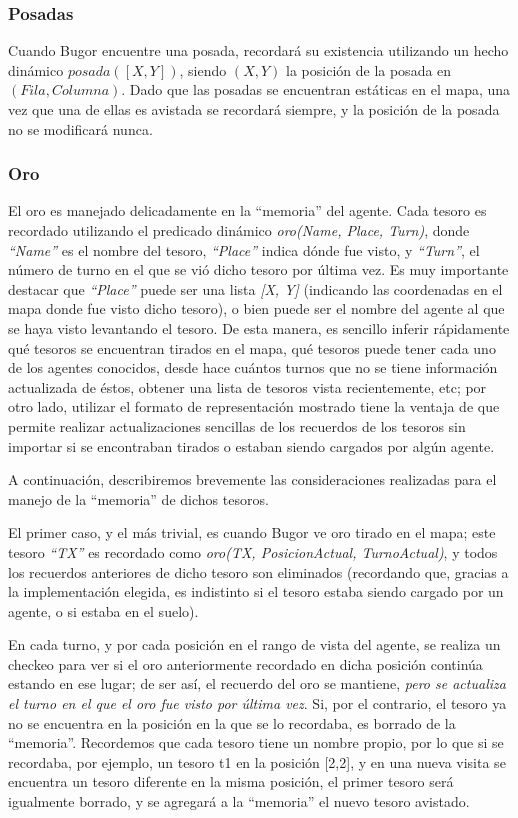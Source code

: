 \documentclass[a4paper,10pt,spanish]{article}
\begin{document}
		\subsubsection{Posadas}
		
		Cuando Bugor encuentre una posada, recordar\'a su existencia utilizando un hecho din\'amico $posada([X, Y])$, siendo $(X, Y)$ la posici\'on de la posada en $(Fila,Columna)$. Dado que las posadas se encuentran est\'aticas en el mapa, una vez que una de ellas es avistada se recordar\'a siempre, y la posici\'on de la posada no se modificar\'a nunca.
		
		\subsubsection{Oro}
		
		El oro es manejado delicadamente en la ``memoria'' del agente. Cada tesoro es recordado utilizando el predicado din\'amico \emph{oro(Name, Place, Turn)}, donde \emph{``Name''} es el nombre del tesoro, \emph{``Place''} indica d\'onde fue visto, y \emph{``Turn''}, el n\'umero de turno en el que se vi\'o dicho tesoro por \'ultima vez. Es muy importante destacar que \emph{``Place''} puede ser una lista \emph{[X, Y]} (indicando las coordenadas en el mapa donde fue visto dicho tesoro), o bien puede ser el nombre del agente al que se haya visto levantando el tesoro. De esta manera, es sencillo inferir r\'apidamente qu\'e tesoros se encuentran tirados en el mapa, qu\'e tesoros puede tener cada uno de los agentes conocidos, desde hace cu\'antos turnos que no se tiene informaci\'on actualizada de \'estos, obtener una lista de tesoros vista recientemente, etc; por otro lado, utilizar el formato de representaci\'on mostrado tiene la ventaja de que permite realizar actualizaciones sencillas de los recuerdos de los tesoros sin importar si se encontraban tirados o estaban siendo cargados por alg\'un agente.
		
		A continuaci\'on, describiremos brevemente las consideraciones realizadas para el manejo de la ``memoria'' de dichos tesoros.
		
		El primer caso, y el m\'as trivial, es cuando Bugor ve oro tirado en el mapa; este tesoro \emph{``TX''} es recordado como \emph{oro(TX, PosicionActual, TurnoActual)}, y todos los recuerdos anteriores de dicho tesoro son eliminados (recordando que, gracias a la implementaci\'on elegida, es indistinto si el tesoro estaba siendo cargado por un agente, o si estaba en el suelo).
		
		En cada turno, y por cada posici\'on en el rango de vista del agente, se realiza un checkeo para ver si el oro anteriormente recordado en dicha posici\'on contin\'ua estando en ese lugar; de ser as\'i, el recuerdo del oro se mantiene, \emph{pero se actualiza el turno en el que el oro fue visto por \'ultima vez}. Si, por el contrario, el tesoro ya no se encuentra en la posici\'on en la que se lo recordaba, es borrado de la ``memoria''. Recordemos que cada tesoro tiene un nombre propio, por lo que si se recordaba, por ejemplo, un tesoro t1 en la posici\'on [2,2], y en una nueva visita se encuentra un tesoro diferente en la misma posici\'on, el primer tesoro ser\'a igualmente borrado, y se agregar\'a a la ``memoria'' el nuevo tesoro avistado.
		
\end{document}
